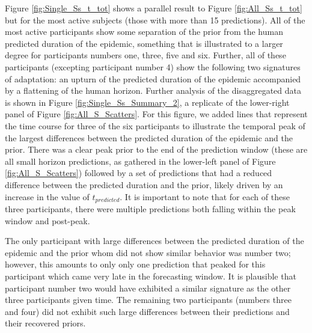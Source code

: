 \documentclass[a4paper,man,natbib]{apa6}
\begin{document}
Figure \ref{fig:Single_Ss_t_tot} shows a parallel result to Figure \ref{fig:All_Ss_t_tot} but for the most active subjects (those with more than 15 predictions).  All of the most active participants show some separation of the prior from the human predicted duration of the epidemic, something that is illustrated to a larger degree for participants numbers one, three, five and six.  Further, all of these participants (excepting participant number 4) show the following two signatures of adaptation: an upturn of the predicted duration of the epidemic accompanied by a flattening of the human horizon.  Further analysis of the disaggregated data is shown in Figure \ref{fig:Single_Ss_Summary_2}, a replicate of the lower-right panel of Figure \ref{fig:All_S_Scatters}. For this figure, we added lines that represent the time course for three of the six participants to illustrate the temporal peak of the largest differences between the predicted duration of the epidemic and the prior.  There was a clear peak prior to the end of the prediction window (these are all small horizon predictions, as gathered in the lower-left panel of Figure \ref{fig:All_S_Scatters}) followed by a set of predictions that had a reduced difference between the predicted duration and the prior, likely driven by an increase in the value of $t_{predicted}$.  It is important to note that for each of these three participants, there were multiple predictions both falling within the peak window and post-peak. 

The only participant with large differences between the predicted duration of the epidemic and the prior whom did not show similar behavior was number two; however, this amounts to only only one prediction that peaked for this participant which came very late in the forecasting window.  It is plausible that participant number two would have exhibited a similar signature as the other three participants given time.  The remaining two participants (numbers three and four)  did not exhibit such large differences between their predictions and their recovered priors. 
\end{document}
